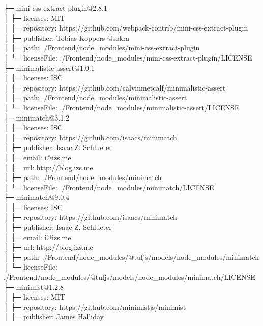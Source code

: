 ├─ mini-css-extract-plugin@2.8.1\\
│  ├─ licenses: MIT\\
│  ├─ repository: https://github.com/webpack-contrib/mini-css-extract-plugin\\
│  ├─ publisher: Tobias Koppers @sokra\\
│  ├─ path: ./Frontend/node\_modules/mini-css-extract-plugin\\
│  └─ licenseFile: ./Frontend/node\_modules/mini-css-extract-plugin/LICENSE\\
├─ minimalistic-assert@1.0.1\\
│  ├─ licenses: ISC\\
│  ├─ repository: https://github.com/calvinmetcalf/minimalistic-assert\\
│  ├─ path: ./Frontend/node\_modules/minimalistic-assert\\
│  └─ licenseFile: ./Frontend/node\_modules/minimalistic-assert/LICENSE\\
├─ minimatch@3.1.2\\
│  ├─ licenses: ISC\\
│  ├─ repository: https://github.com/isaacs/minimatch\\
│  ├─ publisher: Isaac Z. Schlueter\\
│  ├─ email: i@izs.me\\
│  ├─ url: http://blog.izs.me\\
│  ├─ path: ./Frontend/node\_modules/minimatch\\
│  └─ licenseFile: ./Frontend/node\_modules/minimatch/LICENSE\\
├─ minimatch@9.0.4\\
│  ├─ licenses: ISC\\
│  ├─ repository: https://github.com/isaacs/minimatch\\
│  ├─ publisher: Isaac Z. Schlueter\\
│  ├─ email: i@izs.me\\
│  ├─ url: http://blog.izs.me\\
│  ├─ path: ./Frontend/node\_modules/@tufjs/models/node\_modules/minimatch\\
│  └─ licenseFile: ./Frontend/node\_modules/@tufjs/models/node\_modules/minimatch/LICENSE\\
├─ minimist@1.2.8\\
│  ├─ licenses: MIT\\
│  ├─ repository: https://github.com/minimistjs/minimist\\
│  ├─ publisher: James Halliday\\
